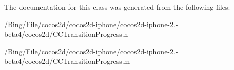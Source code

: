 The documentation for this class was generated from the following files\-:\begin{DoxyCompactItemize}
\item 
/\-Bing/\-File/cocos2d/cocos2d-\/iphone/cocos2d-\/iphone-\/2.-\/beta4/cocos2d/C\-C\-Transition\-Progress.\-h\item 
/\-Bing/\-File/cocos2d/cocos2d-\/iphone/cocos2d-\/iphone-\/2.-\/beta4/cocos2d/C\-C\-Transition\-Progress.\-m\end{DoxyCompactItemize}
